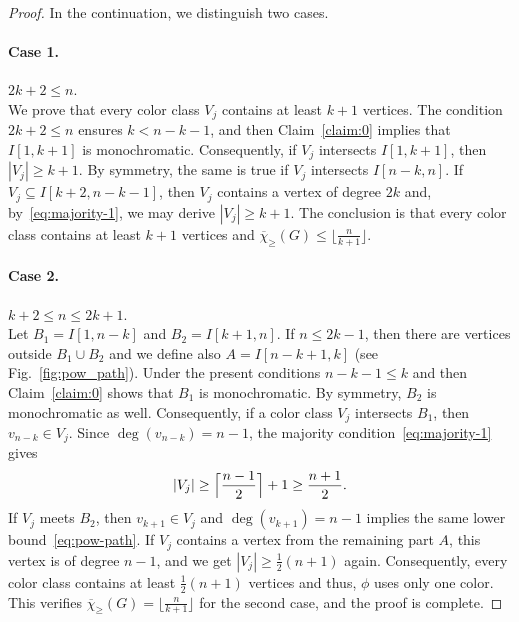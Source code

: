 \documentclass{article}
\theoremstyle{definition}
\newcommand{\mc}{\overline{\chi}_{\geqslant}}
\begin{document}
\begin{proof}
   In the continuation, we distinguish two cases.
  \paragraph{Case 1.} $2k+2 \le n$.\\
    We prove that every color class $V_j$ contains at least $k+1$ vertices. The condition $2k+2 \le n$ ensures $k < n-k-1$, and then Claim~\ref{claim:0} implies that $I[1,k+1]$ is monochromatic. Consequently, if $V_j$ intersects $I[1,k+1]$, then $|V_j| \ge k+1$. By symmetry, the same is true if $V_j$ intersects $I[n-k,n]$. If $V_j \subseteq I[k+2, n-k-1]$, then $V_j$ contains a vertex of degree $2k$ and, by~\eqref{eq:majority-1}, we may derive $|V_j| \ge k+1$. The conclusion is that every color class contains at least $k+1$ vertices and $\mc(G) \leq \lfloor \frac{n}{k+1} \rfloor$.
     \paragraph{Case 2.} $k+2 \le n \le 2k+1$.\\
     Let $B_1=I[1,n-k]$ and $B_2=I[k+1,n]$. If $n \leq 2k-1$, then there are vertices outside $B_1 \cup B_2$ and we define also $A=I[n-k+1, k]$ (see Fig.~\ref{fig:pow_path}).  Under the present conditions $n-k-1 \le k$ and then Claim~\ref{claim:0} shows that $B_1$ is monochromatic. By symmetry, $B_2$ is monochromatic as well. Consequently, if a color class $V_j$ intersects $B_1$, then $v_{n-k} \in V_j$. Since $\deg(v_{n-k})=n-1$, the majority condition~\eqref{eq:majority-1} gives
     \begin{equation} \label{eq:pow-path}
         |V_j| \ge \Bigl\lceil\frac{n-1}{2} \Bigr\rceil +1\ge \frac{n+1}{2}.
     \end{equation}
     If $V_j$ meets $B_2$, then $v_{k+1} \in V_j$ and $\deg(v_{k+1})=n-1$ implies the same lower bound~\eqref{eq:pow-path}. If $V_j$ contains a vertex from the remaining part $A$, this vertex is of degree $n-1$, and we get $|V_j| \ge \frac{1}{2}(n+1)$ again. Consequently, every color class contains at least $\frac{1}{2}(n+1)$ vertices and thus, $\phi$ uses only one color. This verifies $\mc(G)= \lfloor \frac{n}{k+1} \rfloor$ for the second case, and the proof is complete. 
\end{proof}
\end{document}
